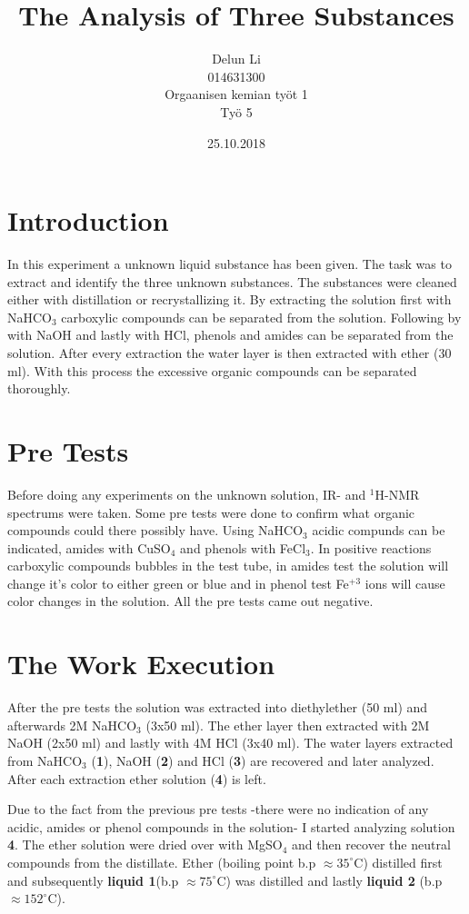 \documentclass[11pt,a4paper]{article}
\title{The Analysis of Three Substances }
\author{Delun Li\\014631300\\Orgaanisen kemian työt 1\\Työ 5}
\date{25.10.2018}
\begin{document}
\maketitle

\pagebreak


\section{Introduction}

In this experiment a unknown liquid substance has been given. The task was to extract and identify the three unknown substances. The substances were cleaned either with distillation or recrystallizing it. By extracting the solution first with NaHCO$_3$ carboxylic compounds can be separated from the solution. Following by with NaOH and lastly with HCl, phenols and amides can be separated from the solution. After every extraction the water layer is then extracted with ether (30 ml). With this process the excessive organic compounds can be separated thoroughly.  

\section{Pre Tests }

Before doing any experiments on the unknown solution, IR- and $^1$H-NMR spectrums were taken. Some pre tests were done to confirm what organic compounds could there possibly have. Using NaHCO$_3$ acidic compunds can be indicated, amides with CuSO$_4$ and phenols with FeCl$_3$. In positive reactions carboxylic compounds bubbles in the test tube, in amides test the solution will change it's color to either green or blue and in phenol test Fe$^{+3}$ ions will cause color changes in the solution. All the pre tests came out negative. 

\section{The Work Execution}

After the pre tests the solution was extracted into diethylether (50 ml) and afterwards 2M NaHCO$_3$ (3x50 ml). The ether layer then extracted with 2M NaOH (2x50 ml) and lastly with 4M HCl (3x40 ml). The water layers extracted from NaHCO$_3$ (\textbf{1}), NaOH (\textbf{2}) and HCl (\textbf{3}) are recovered and later analyzed. After each extraction ether solution (\textbf{4}) is left. 

Due to the fact from the previous pre tests \large-there were no indication of any acidic, amides or phenol compounds in the solution\large- 
I started analyzing solution \textbf{4}. The ether solution were dried over with MgSO$_4$ and then recover the neutral compounds from the distillate. Ether (boiling point b.p $\approx 35 ^{\circ}$C) distilled first and subsequently \textbf{liquid 1}(b.p $\approx 75 ^{\circ}$C) was distilled and lastly \textbf{liquid 2} (b.p $\approx 152 ^{\circ}$C). 
\end{document}
